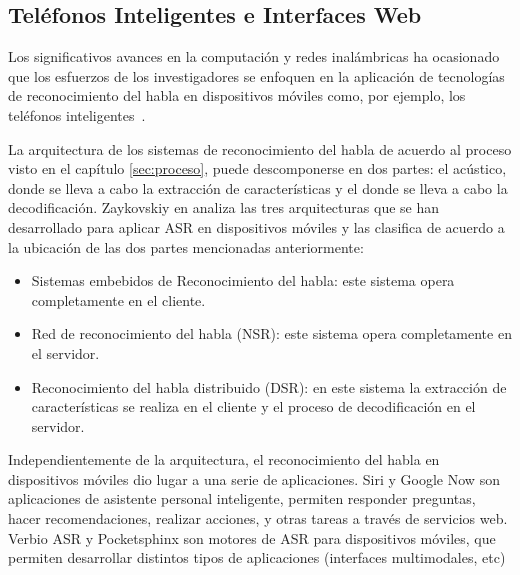 \subsection{Tel\'efonos Inteligentes e Interfaces Web}
\label{sec:smartphones}

Los significativos avances en la computaci\'on y redes inal\'ambricas ha ocasionado
que los esfuerzos de los investigadores se enfoquen en la aplicaci\'on de tecnolog\'ias de
reconocimiento del habla en dispositivos m\'oviles como, por ejemplo, los tel\'efonos 
\mbox{inteligentes \cite{TanAutomatic2008}}.

La arquitectura de los sistemas de reconocimiento del habla de acuerdo al proceso visto en el cap\'itulo \ref{sec:proceso},
puede descomponerse en dos partes: el  ac\'ustico, donde se lleva a cabo
la extracci\'on de caracter\'isticas  y el  donde se lleva a cabo la decodificaci\'on. 
Zaykovskiy en \cite{ZaykovskiySurvey2006} analiza las tres arquitecturas que se han desarrollado
para aplicar ASR en dispositivos m\'oviles y las clasifica de acuerdo a la ubicaci\'on de las dos partes
mencionadas anteriormente:

\begin{itemize}
    \item Sistemas embebidos de Reconocimiento del habla: este sistema opera completamente en el cliente.
    \item Red de reconocimiento del habla (NSR): este sistema opera completamente en el servidor. 
    \item Reconocimiento del habla distribuido (DSR): en este sistema la extracci\'on de caracter\'isticas se realiza
        en el cliente y el proceso de decodificaci\'on en el servidor.
\end{itemize}

Independientemente de la arquitectura, el reconocimiento del habla en dispositivos m\'oviles dio lugar a una 
serie de aplicaciones. Siri \cite{AppleSiri, OneAccordSiri} y Google Now \cite{GoogleNow} 
son aplicaciones de asistente personal inteligente, permiten responder preguntas,
hacer recomendaciones, realizar acciones, y otras tareas a trav\'es de servicios web. Verbio ASR \cite{VerbioASR} y 
Pocketsphinx \cite{HugginsDainesPocketSphinx2006, PocketSphinxHomePage} son motores de ASR para dispositivos
m\'oviles, que permiten desarrollar distintos tipos de aplicaciones (interfaces multimodales, etc)

